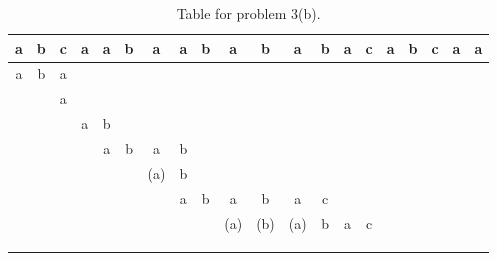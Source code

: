 \documentclass[12pt]{article}
\begin{document}
\begin{table}[!ht]
\Large{
\begin{center}
\begin{tabular}{|c|c|c|c|c|c|c|c|c|c|c|c|c|c|c|c|c|c|c|c|}
\hline
a&b&c&a&a&b&a&a&b&a&b&a&b&a&c&a&b&c&a&a\\
\hline
\hline
a&b&a&&&&&&&&&&&&&&&&&\\
\hline
&&a&&&&&&&&&&&&&&&&&\\
\hline
&&&a&b&&&&&&&&&&&&&&&\\
\hline
&&&&a&b&a&b&&&&&&&&&&&&\\
\hline
&&&&&&(a)&b&&&&&&&&&&&&\\
\hline
&&&&&&&a&b&a&b&a&c&&&&&&&\\
\hline
&&&&&&&&&(a)&(b)&(a)&b&a&c&&&&&\\
\hline
&&&&&&&&&&&&&&&&&&&\\
\hline
&&&&&&&&&&&&&&&&&&&\\
\hline
&&&&&&&&&&&&&&&&&&&\\
\hline
\end{tabular}
\end{center}}
\caption{Table for problem 3(b).}\label{kmp}
\end{table}

\end{document}
